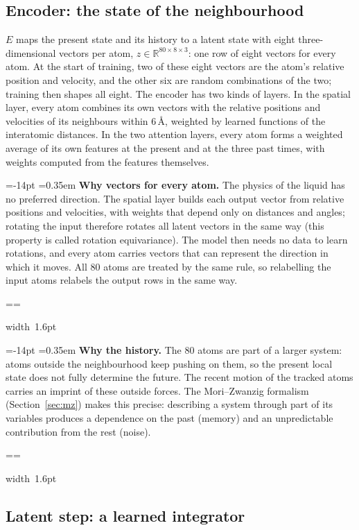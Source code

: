 \documentclass[11pt,a4paper]{article}
\makeatletter
\numberwithin{equation}{section}
\newcommand{\R}{\mathbb R}
\newcommand{\pcmWhyPiece}[1]{%
  \noindent\hbox{{\color{pcmAmber}\vrule width 1.6pt}%
    \setlength{\fboxsep}{7pt}\colorbox{pcmAmber!5}{\vbox{\unvbox#1}}}\par}
\newcommand{\pcmWhyEmit}{%
  \vbadness=10000
  \loop
    \par
    \ifdim\pagegoal=\maxdimen
      \pcmWhyAvail=\dimexpr\vsize-14pt\relax
    \else
      \pcmWhyAvail=\dimexpr\pagegoal-\pagetotal-19pt\relax
    \fi
    \ifdim\dimexpr\ht\pcmWhyAll+\dp\pcmWhyAll\relax>\pcmWhyAvail
      \ifdim\pcmWhyAvail<3\baselineskip
        \newpage
      \else
        \setbox\pcmWhyPart\vsplit\pcmWhyAll to \pcmWhyAvail
        \pcmWhyPiece\pcmWhyPart
      \fi
    \else
      \pcmWhyPiece\pcmWhyAll
    \fi
  \ifvoid\pcmWhyAll\else\repeat}
\newenvironment{why}[1][Why]{%
  \par\addvspace{.55em}%
  \setbox\pcmWhyAll\vbox\bgroup
    \hsize=\dimexpr\linewidth-1.6pt-14pt\relax
    \@parboxrestore\fussy
    \parskip=0.35em\relax
    \noindent\textcolor{pcmAmber}{\bfseries #1.}\enspace\ignorespaces}%
 {\par\egroup
  \splittopskip=\topskip\splitmaxdepth=\maxdepth
  \pcmWhyEmit
  \par\addvspace{.55em}}
\makeatother
\begin{document}
\subsection{Encoder: the state of the neighbourhood}

$E$ maps the present state and its history to a latent state with eight
three-dimensional vectors per atom, $z\in\R^{80\times8\times3}$: one row of eight
vectors for every atom. At the start of training, two of these eight vectors are
the atom's relative position and velocity, and the other six are random
combinations of the two; training then shapes all eight. The encoder has two kinds
of layers. In the spatial layer, every atom combines its own vectors with the
relative positions and velocities of its neighbours within 6\,\AA, weighted by
learned functions of the interatomic distances. In the two attention layers, every
atom forms a weighted average of its own features at the present and at the three
past times, with weights computed from the features themselves.

\begin{why}[Why vectors for every atom]
The physics of the liquid has no preferred direction. The spatial layer builds each
output vector from relative positions and velocities, with weights that depend only
on distances and angles; rotating the input therefore rotates all latent vectors in
the same way (this property is called rotation equivariance). The model then needs
no data to learn rotations, and every atom carries vectors that can represent the
direction in which it moves. All 80 atoms are treated by the same rule, so
relabelling the input atoms relabels the output rows in the same way.
\end{why}

\begin{why}[Why the history]
The 80 atoms are part of a larger system: atoms outside the neighbourhood keep
pushing on them, so the present local state does not fully determine the future.
The recent motion of the tracked atoms carries an imprint of these outside forces.
The Mori--Zwanzig formalism (Section~\ref{sec:mz}) makes this precise: describing
a system through part of its variables produces a dependence on the past (memory)
and an unpredictable contribution from the rest (noise).
\end{why}

\subsection{Latent step: a learned integrator}
\end{document}
